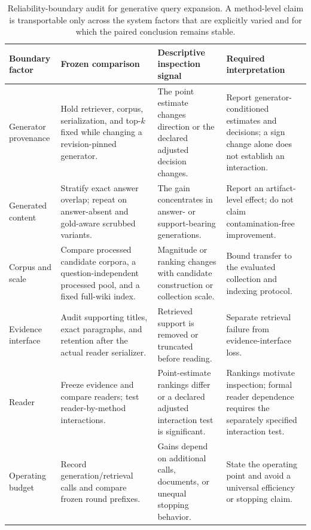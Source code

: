 \begin{table}[t]
\centering
\caption{Reliability-boundary audit for generative query expansion. A method-level claim is transportable only across the system factors that are explicitly varied and for which the paired conclusion remains stable.}
\label{tab:reliability_boundary_protocol}
\scriptsize
\begin{threeparttable}
\setlength{\tabcolsep}{3pt}
\begin{tabularx}{\textwidth}{>{\raggedright\arraybackslash}p{} >{\raggedright\arraybackslash}p{} >{\raggedright\arraybackslash}p{} >{\raggedright\arraybackslash}X}
\toprule
Boundary factor & Frozen comparison & Descriptive inspection signal & Required interpretation \\
\midrule
Generator provenance & Hold retriever, corpus, serialization, and top-$k$ fixed while changing a revision-pinned generator. & The point estimate changes direction or the declared adjusted decision changes. & Report generator-conditioned estimates and decisions; a sign change alone does not establish an interaction. \\
Generated content & Stratify exact answer overlap; repeat on answer-absent and gold-aware scrubbed variants. & The gain concentrates in answer- or support-bearing generations. & Report an artifact-level effect; do not claim contamination-free improvement. \\
Corpus and scale & Compare processed candidate corpora, a question-independent processed pool, and a fixed full-wiki index. & Magnitude or ranking changes with candidate construction or collection scale. & Bound transfer to the evaluated collection and indexing protocol. \\
Evidence interface & Audit supporting titles, exact paragraphs, and retention after the actual reader serializer. & Retrieved support is removed or truncated before reading. & Separate retrieval failure from evidence-interface loss. \\
Reader & Freeze evidence and compare readers; test reader-by-method interactions. & Point-estimate rankings differ or a declared adjusted interaction test is significant. & Rankings motivate inspection; formal reader dependence requires the separately specified interaction test. \\
Operating budget & Record generation/retrieval calls and compare frozen round prefixes. & Gains depend on additional calls, documents, or unequal stopping behavior. & State the operating point and avoid a universal efficiency or stopping claim. \\

\end{tabularx}
\end{threeparttable}
\end{table}
